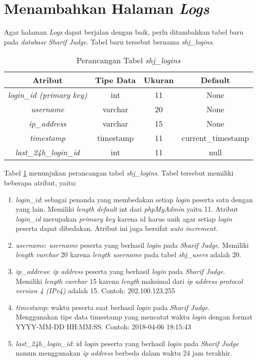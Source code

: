 \section{Menambahkan Halaman \textit{Logs}}%
\label{chap:logs}
Agar halaman \textit{Logs} dapat berjalan dengan baik, perlu ditambahkan tabel baru pada \textit{database} \textit{Sharif Judge}. Tabel baru tersebut bernama \textit{shj\_logins}. 
\begin{table}[H] %
	\centering 
	\caption{Perancangan Tabel \textit{shj\_logins}}
	\label{tab:tabellogs}
		\begin{tabular}{|c|c|c|c|}
			\hline
			\textbf{Atribut} & \textbf{Tipe Data} & \textbf{Ukuran}  & \textbf{Default} \\
			\hline
			\textit{login\_id (primary key)} & int & 11  & None \\
			\hline
			\textit{username} & varchar & 20  & None \\
			\hline
			\textit{ip\_address} & varchar & 15  & None \\
			\hline
			\textit{timestamp} & timestamp & 11  & current\_timestamp \\
			\hline
			\textit{last\_24h\_login\_id}	 & int & 11  & null \\
			\hline
		\end{tabular}
\end{table}

Tabel \ref{tab:tabellogs} menunjukan perancangan tabel \textit{shj\_logins}. Tabel tersebut memiliki beberapa atribut, yaitu:
\begin{enumerate}
	\item \textit{login\_id}: sebagai penanda yang membedakan setiap \textit{login} peserta satu dengan yang lain. Memiliki \textit{length default} int dari \textit{phpMyAdmin} yaitu 11. Atribut \textit{login\_id} merupakan \textit{primary key} karena id harus unik agar setiap \textit{login} peserta dapat dibedakan. Atribut ini juga bersifat \textit{auto increment}.
	\item \textit{username}: \textit{username} peserta yang berhasil \textit{login} pada \textit{Sharif Judge}. Memiliki \textit{length varchar} 20 karena \textit{length username} pada tabel \textit{shj\_users} adalah 20.
	\item \textit{ip\_address}: \textit{ip address} peserta yang berhasil \textit{login} pada \textit{Sharif Judge}. Memiliki \textit{length varchar} 15 karena \textit{length} maksimal dari \textit{ip address protocol version 4 (IPv4)} adalah 15. Contoh: 202.100.123.255
	\item \textit{timestamp}: waktu peserta saat berhasil \textit{login} pada \textit{Sharif Judge}. Menggunakan tipe data timestamp yang mencatat waktu \textit{login} dengan format YYYY-MM-DD HH:MM:SS. Contoh: 2018-04-06 18:15:43
	\item \textit{last\_24h\_login\_id}: id \textit{login} peserta yang berhasil \textit{login} pada \textit{Sharif Judge} namun menggunakan \textit{ip address} berbeda dalam waktu 24 jam terakhir.
\end{enumerate}

